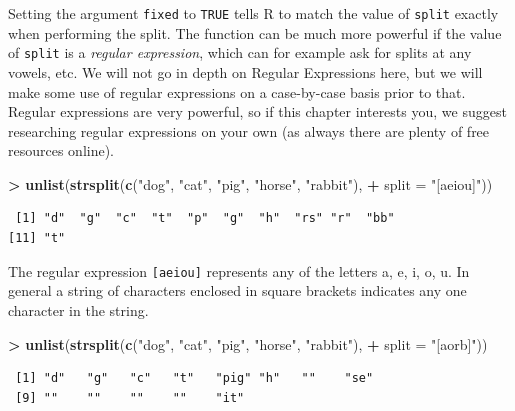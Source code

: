 \documentclass[
]{krantz}
\makeatletter
\newenvironment{Shaded}{\begin{snugshade}}{\end{snugshade}}
\newcommand{\DataTypeTok}[1]{\textcolor[rgb]{0.27,0.27,0.27}{#1}}
\newcommand{\KeywordTok}[1]{\textcolor[rgb]{0.27,0.27,0.27}{\textbf{#1}}}
\newcommand{\NormalTok}[1]{#1}
\newcommand{\OperatorTok}[1]{\textcolor[rgb]{0.43,0.43,0.43}{\textbf{#1}}}
\newcommand{\StringTok}[1]{\textcolor[rgb]{0.5,0.5,0.5}{#1}}
\newenvironment{kframe}{%
\medskip{}
\setlength{\fboxsep}{.8em}
 \def\at@end@of@kframe{}%
 \ifinner\ifhmode%
  \def\at@end@of@kframe{\end{minipage}}%
  \begin{minipage}{\columnwidth}%
 \fi\fi%
 \def\FrameCommand##1{\hskip\@totalleftmargin \hskip-\fboxsep
 \colorbox{shadecolor}{##1}\hskip-\fboxsep
     \hskip-\linewidth \hskip-\@totalleftmargin \hskip\columnwidth}%
 \MakeFramed {\advance\hsize-\width
   \@totalleftmargin\z@ \linewidth\hsize
   \@setminipage}}%
 {\par\unskip\endMakeFramed%
 \at@end@of@kframe}
\renewenvironment{Shaded}{\begin{kframe}}{\end{kframe}}
\makeatother
\begin{document}
Setting the argument \texttt{fixed} to \texttt{TRUE} tells R to match the value of \texttt{split} exactly when performing the split. The function can be much more powerful if the value of \texttt{split} is a \emph{regular expression}, which can for example ask for splits at any vowels, etc. We will not go in depth on Regular Expressions here, but we will make some use of regular expressions on a case-by-case basis prior to that. Regular expressions are very powerful, so if this chapter interests you, we suggest researching regular expressions on your own (as always there are plenty of free resources online).

\begin{Shaded}
\begin{Highlighting}[]
\OperatorTok{\textgreater{}}\StringTok{ }\KeywordTok{unlist}\NormalTok{(}\KeywordTok{strsplit}\NormalTok{(}\KeywordTok{c}\NormalTok{(}\StringTok{"dog"}\NormalTok{, }\StringTok{"cat"}\NormalTok{, }\StringTok{"pig"}\NormalTok{, }\StringTok{"horse"}\NormalTok{, }\StringTok{"rabbit"}\NormalTok{), }
\OperatorTok{+}\StringTok{                 }\DataTypeTok{split =} \StringTok{"[aeiou]"}\NormalTok{))}
\end{Highlighting}
\end{Shaded}

\begin{verbatim}
 [1] "d"  "g"  "c"  "t"  "p"  "g"  "h"  "rs" "r"  "bb"
[11] "t" 
\end{verbatim}

The regular expression \texttt{{[}aeiou{]}} represents any of the letters a, e, i, o, u. In general a string of characters enclosed in square brackets indicates any one character in the string.

\begin{Shaded}
\begin{Highlighting}[]
\OperatorTok{\textgreater{}}\StringTok{ }\KeywordTok{unlist}\NormalTok{(}\KeywordTok{strsplit}\NormalTok{(}\KeywordTok{c}\NormalTok{(}\StringTok{"dog"}\NormalTok{, }\StringTok{"cat"}\NormalTok{, }\StringTok{"pig"}\NormalTok{, }\StringTok{"horse"}\NormalTok{, }\StringTok{"rabbit"}\NormalTok{), }
\OperatorTok{+}\StringTok{                 }\DataTypeTok{split =} \StringTok{"[aorb]"}\NormalTok{))}
\end{Highlighting}
\end{Shaded}

\begin{verbatim}
 [1] "d"   "g"   "c"   "t"   "pig" "h"   ""    "se" 
 [9] ""    ""    ""    ""    "it" 
\end{verbatim}
\end{document}
